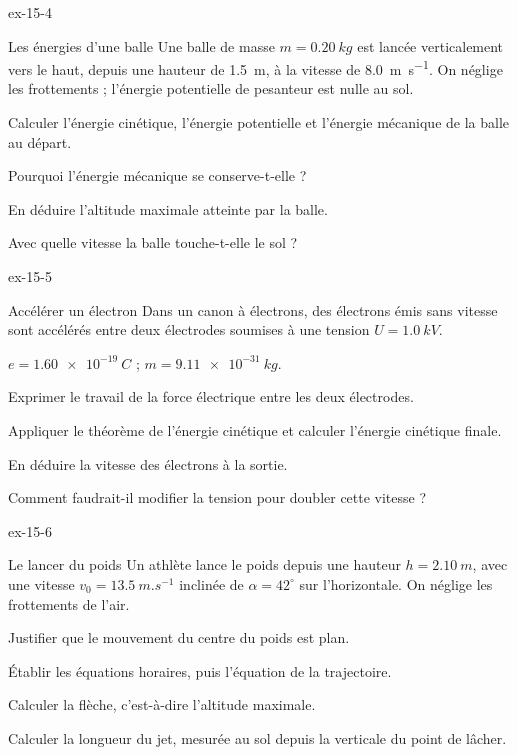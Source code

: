 \begin{blocLivre}{ex-15-4}
\begin{exercice}[1]{Les énergies d'une balle}
Une balle de masse $m=\qty{0,20}{kg}$ est lancée verticalement vers le haut, depuis une hauteur de \qty{1,5}{m}, à la
vitesse de \qty{8,0}{m.s^{-1}}. On néglige les frottements ; l'énergie potentielle de pesanteur est nulle au sol.
\begin{questions}
\item Calculer l'énergie cinétique, l'énergie potentielle et l'énergie mécanique de la balle au départ.
\item Pourquoi l'énergie mécanique se conserve-t-elle ?
\item En déduire l'altitude maximale atteinte par la balle.
\item Avec quelle vitesse la balle touche-t-elle le sol ?
\end{questions}
\end{exercice}
\end{blocLivre}
\begin{blocLivre}{ex-15-5}
\begin{exercice}[1]{Accélérer un électron}
Dans un canon à électrons, des électrons émis sans vitesse sont accélérés entre deux électrodes soumises à une tension
$U=\qty{1,0}{kV}$.
\begin{donnees}
$e=\qty{1,60e-19}{C}$ ; $m=\qty{9,11e-31}{kg}$.
\end{donnees}
\begin{questions}
\item Exprimer le travail de la force électrique entre les deux électrodes.
\item Appliquer le théorème de l'énergie cinétique et calculer l'énergie cinétique finale.
\item En déduire la vitesse des électrons à la sortie.
\item Comment faudrait-il modifier la tension pour doubler cette vitesse ?
\end{questions}
\end{exercice}
\end{blocLivre}
\begin{blocLivre}{ex-15-6}
\begin{exercice}[2]{Le lancer du poids}
Un athlète lance le poids depuis une hauteur $h=\qty{2,10}{m}$, avec une vitesse $v_0=\qty{13,5}{m.s^{-1}}$ inclinée de
$\alpha=42^\circ$ sur l'horizontale. On néglige les frottements de l'air.
\begin{questions}
\item Justifier que le mouvement du centre du poids est plan.
\item Établir les équations horaires, puis l'équation de la trajectoire.
\item Calculer la flèche, c'est-à-dire l'altitude maximale.
\item Calculer la longueur du jet, mesurée au sol depuis la verticale du point de lâcher.
\end{questions}
\end{exercice}
\end{blocLivre}
